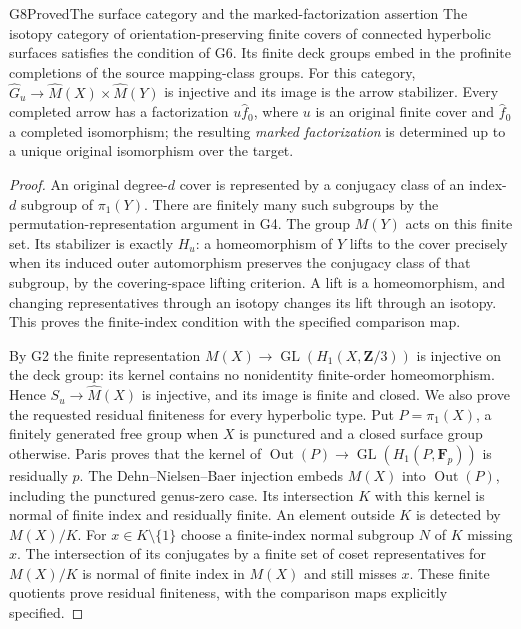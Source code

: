 \begin{result}{G8}{Proved}{The surface category and the marked-factorization assertion}
The isotopy category of orientation-preserving finite covers of connected
hyperbolic surfaces satisfies the condition of G6. Its finite deck groups
embed in the profinite completions of the source mapping-class groups.
For this category, $\widehat G_u\to\widehat M(X)\times\widehat M(Y)$
is injective and its image is the arrow stabilizer.
Every completed arrow has a factorization $u\widehat f_0$, where $u$
is an original finite cover and $\widehat f_0$ a completed isomorphism;
the resulting \emph{marked factorization} is determined up to a unique
original isomorphism over the target.
\end{result}
\begin{proof}
An original degree-$d$ cover is represented by a conjugacy class of an
index-$d$ subgroup of $\pi_1(Y)$. There are finitely many such subgroups
by the permutation-representation argument in G4. The group $M(Y)$
acts on this finite set. Its stabilizer is exactly $H_u$: a
homeomorphism of $Y$ lifts to the cover precisely when its induced
outer automorphism preserves the conjugacy class of that subgroup,
by the covering-space lifting criterion. A lift is a homeomorphism,
and changing representatives through an isotopy changes its lift
through an isotopy. This proves the finite-index condition with the
specified comparison map.

By G2 the finite representation
$M(X)\to\operatorname{GL}(H_1(X,\mathbf Z/3))$ is injective on the
deck group: its kernel contains no nonidentity finite-order
homeomorphism. Hence $S_u\to\widehat M(X)$ is injective, and its
image is finite and closed. We also prove the requested residual
finiteness for every hyperbolic type. Put $P=\pi_1(X)$, a finitely
generated free group when $X$ is punctured and a closed surface group
otherwise. Paris \cite[Theorem 1.4]{G_Paris} proves that the kernel
of $\operatorname{Out}(P)\to\operatorname{GL}(H_1(P,\mathbf F_p))$
is residually $p$. The Dehn--Nielsen--Baer injection
\cite[Theorem 8.8]{G_FarbMargalit} embeds $M(X)$ into
$\operatorname{Out}(P)$, including the punctured genus-zero case.
Its intersection $K$ with this kernel is normal of finite index and
residually finite. An element outside $K$ is detected by $M(X)/K$.
For $x\in K\setminus\{1\}$ choose a finite-index normal subgroup
$N$ of $K$ missing $x$. The intersection of its conjugates by a
finite set of coset representatives for $M(X)/K$ is normal of finite
index in $M(X)$ and still misses $x$. These finite quotients prove
residual finiteness, with the comparison maps explicitly specified.


\end{proof}
